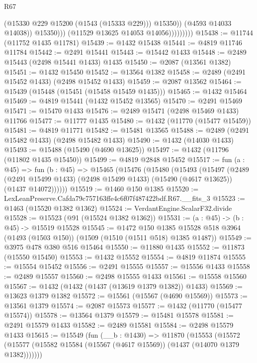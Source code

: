 \begin{lexlean}{R67}
\begin{coremodule}
                                (@15330 @229 @15200 (@1543 (@15333 @229)))
                                @15350))
                            (@4593 @14033 @14038))
                          @15350)))
                    (@11529 @13625 @14053 @14056)))))))))
@15438 := @11744 (@11752 @1435 @11781)
@15439 := @1432 @15438
@15441 := @4819 @11746 @11784
@15442 := @2491 @15441
@15443 := @15442 @1433
@15448 := @2489 @15443 (@2498 @15441 @1433) @1435
@15450 := @2087 (@13561 @1382)
@15451 := @1432 @15450
@15452 := @13564 @1382
@15458 := @2489 (@2491 @15452 @1433) (@2498 @15452 @1433)
@15459 := @2087 @13562
@15464 := @15439 (@15448 (@15451 (@15458 @15459 @1435)))
@15465 := @1432 @15464
@15469 := @4819 @15441 (@1432 @15452 @13565)
@15470 := @2491 @15469
@15471 := @15470 @1433
@15476 := @2489 @15471 (@2498 @15469 @1433) @11766
@15477 := @11777 @1435
@15480 := @1432 (@11770 (@15477 @15459))
@15481 := @4819 @11771
@15482 := @15481 @13565
@15488 := @2489 (@2491 @15482 @1433) (@2498 @15482 @1433)
@15490 := @1432 (@14030 @1433)
@15493 := @15488 (@15490 (@4690 @13625))
@15497 := @1432 (@11796 (@11802 @1435 @15450))
@15499 := @4819 @2848 @15452
@15517 := fun (a : @45) =>
  fun (b : @45) =>
  @15465
    (@15476
      (@15480
        (@15493
          (@15497
            (@2489
              (@2491 @15499 @1433)
              (@2498 @15499 @1433)
              (@15490 (@4617 @13625))
              (@1437 @14072))))))
@15519 := @1460 @150 @1385
@15520 := LexLeanPreserve.Cafda79c757163ffe4c6f07f487422bdf.R67.__fits_3
@15523 := @1463 (@15520 @1382 @1362)
@15524 := VerdantEngine.ScalarF32.divide
@15528 := @15523 (@91 (@15524 @1382 @1362))
@15531 := (a : @45) -> (b : @45) -> @15519 @15528
@15545 := @1472
    @150
    @1385
    @15528
    @518
    @3964
    (@1493 (@1503 @150))
    (@1509 (@1510 (@1511 @518) @1385 @1487))
@15549 := @3975 @478 @380 @516 @15464
@15550 := @11880 @1435
@15552 := @11873 (@15550 @15450)
@15553 := @1432 @15552
@15554 := @4819 @11874
@15555 := @15554 @15452
@15556 := @2491 @15555
@15557 := @15556 @1433
@15558 := @2489 @15557
@15560 := @2498 @15555 @1433
@15561 := @15558 @15560
@15567 := @1432 (@1432 (@1437 (@13619 @1379 @1382)) @1433)
@15569 := @13623 @1379 @1382
@15572 := @15561 (@15567 (@4690 @15569))
@15573 := @13561 @1379
@15574 := @2087 @15573
@15577 := @1432 (@11770 (@15477 @15574))
@15578 := @13564 @1379
@15579 := @15481 @15578
@15581 := @2491 @15579 @1433
@15582 := @2489 @15581
@15584 := @2498 @15579 @1433
@15615 := @15549
    (fun (__b : @1430) =>
    @11870
      (@15553
        (@15572 (@15577 (@15582 @15584 (@15567 (@4617 @15569)) (@1437 (@14070 @1379 @1382)))))))

\end{coremodule}
\end{lexlean}
